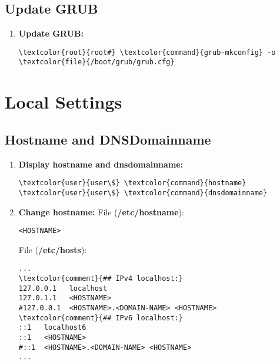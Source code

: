 \documentclass[10pt, a4paper, onecolumn, openany]{book} %
\begin{document}
\section{Update GRUB}
\label{GRUB}
\begin{enumerate}
    \item \textbf{Update GRUB:}
\begin{Verbatim}[commandchars=\\\{\}]
\textcolor{root}{root#} \textcolor{command}{grub-mkconfig} -o \textcolor{file}{/boot/grub/grub.cfg}
\end{Verbatim}
\end{enumerate}
\chapter{Local Settings}
\section{Hostname and DNSDomainname}
\begin{enumerate}
    \item \textbf{Display hostname and dnsdomainname:}
\begin{Verbatim}[commandchars=\\\{\}]
\textcolor{user}{user\$} \textcolor{command}{hostname}
\textcolor{user}{user\$} \textcolor{command}{dnsdomainname}
\end{Verbatim}
    \item \textbf{Change hostname:}
\newline File (\textbf{\textcolor{file}{/etc/hostname}}):
\begin{Verbatim}[commandchars=\\\{\}]
<HOSTNAME>
\end{Verbatim}
File (\textbf{\textcolor{file}{/etc/hosts}}):
\begin{Verbatim}[commandchars=\\\{\}]
...
\textcolor{comment}{## IPv4 localhost:}
127.0.0.1   localhost
127.0.1.1   <HOSTNAME>
#127.0.0.1  <HOSTNAME>.<DOMAIN-NAME> <HOSTNAME>
\textcolor{comment}{## IPv6 localhost:}
::1   localhost6
::1   <HOSTNAME>
#::1  <HOSTNAME>.<DOMAIN-NAME> <HOSTNAME>
...
\end{Verbatim}
\end{enumerate}
\end{document}
